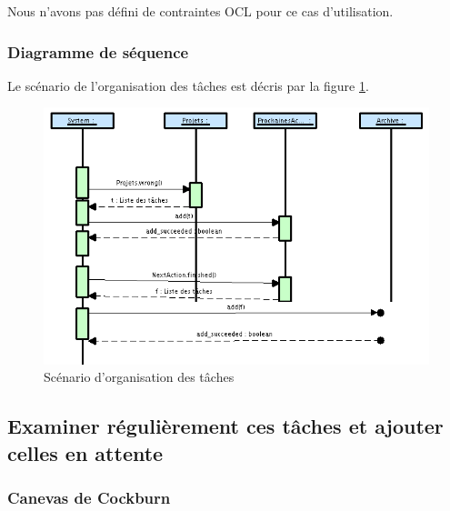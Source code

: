 Nous n'avons pas défini de contraintes OCL pour ce cas d'utilisation.

\subsubsection{Diagramme de séquence}
Le scénario de l'organisation des tâches est décris par la figure \ref{organizeSequence}.
\begin{figure}[!ht]
\begin{center}
\includegraphics[width=12cm]{images/organizeSequence.png}
\caption{Scénario d'organisation des tâches}
\label{organizeSequence}
\end{center}
\end{figure}



\subsection{Examiner régulièrement ces tâches et ajouter celles en attente}

\subsubsection{Canevas de Cockburn}

